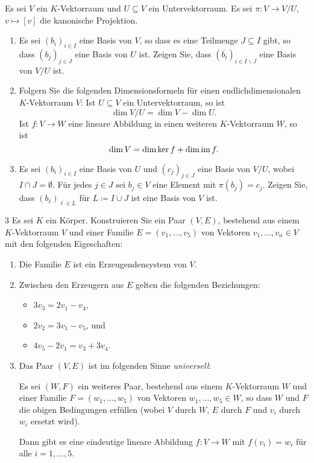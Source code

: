 \begin{question}[subtitle = Basen von Quotientenvektorräumen]{3}
  Es sei $V$ ein $K$-Vektorraum und $U \subseteq V$ ein Untervektorraum.
  Es sei $\pi \colon V \to V\!/U$, $v \mapsto [v]$ die kanonische Projektion.
  \begin{enumerate}[leftmargin=*]
    \item
      Es sei $(b_i)_{i \in I}$ eine Basis von $V$, so dass es eine Teilmenge $J \subseteq I$ gibt, so dass $(b_j)_{j \in J}$ eine Basis von $U$ ist.
      Zeigen Sie, dass $(\overline{b_i})_{i \in I \smallsetminus J}$ eine Basis von $V\!/U$ ist.
    \item
      Folgern Sie die folgenden Di\-men\-si\-ons\-for\-meln für einen end\-lich\-di\-men\-si\-o\-na\-len $K$-Vek\-tor\-raum $V$:
      Ist $U \subseteq V$ ein Untervektorraum, so ist
      \[
        \dim V\!/U = \dim V - \dim U.
      \]
      Ist $f \colon V \to W$ eine lineare Abbildung in einen weiteren $K$-Vektorraum $W$, so ist
      \[
        \dim V = \dim \ker f + \dim \operatorname{im} f.
      \]
    \item
      Es sei $(b_i)_{i \in I}$ eine Basis von $U$ und $(c_j)_{j \in J}$ eine Basis von $V\!/U$, wobei $I \cap J = \emptyset$.
      Für jedes $j \in J$ sei $b_j \in V$ eine Element mit $\pi(b_j) = c_j$.
      Zeigen Sie, dass $(b_\ell)_{\ell \in L}$ für $L \coloneqq I \cup J$ ist eine Basis von $V$ ist.
  \end{enumerate}
\end{question}


\begin{question}[subtitle = Definition von Vektorräumen über Erzeuger und Relationen]{3}
  Es sei $K$ ein Körper.
  Konstruieren Sie ein Paar $(V,E)$, bestehend aus einem $K$-Vektorraum $V$ und einer Familie $E = (v_1, \dotsc, v_5)$ von Vektoren $v_1, \dotsc, v_n \in V$ mit den folgenden Eigeschaften:
  \begin{enumerate}[leftmargin=*]
    \item
      Die Familie $E$ ist ein Erzeugendensystem von $V$.
    \item
      Zwischen den Erzeugern aus $E$ gelten die folgenden Beziehungen:
      \begin{itemize}
        \item
          $3 v_3 = 2 v_1 - v_4$,
        \item
          $2 v_2 = 3 v_1 - v_5$, und
        \item
          $4 v_5 - 2 v_1 = v_3 + 3 v_4$.
      \end{itemize}
    \item
      Das Paar $(V,E)$ ist im folgenden Sinne \emph{universell}:
      
      Es sei $(W, F)$ ein weiteres Paar, bestehend aus einem $K$-Vektorraum $W$ und einer Familie $F = (w_1, \dotsc, w_5)$ von Vektoren $w_1, \dotsc, w_5 \in W$, so dass $W$ und $F$ die obigen Bedingungen erfüllen (wobei $V$ durch $W$, $E$ durch $F$ und $v_i$ durch $w_i$ ersetzt wird).
      
      Dann gibt es eine eindeutige lineare Abbildung $f \colon V \to W$ mit $f(v_i) = w_i$ für alle $i = 1, \dotsc, 5$.
  \end{enumerate}
\end{question}


